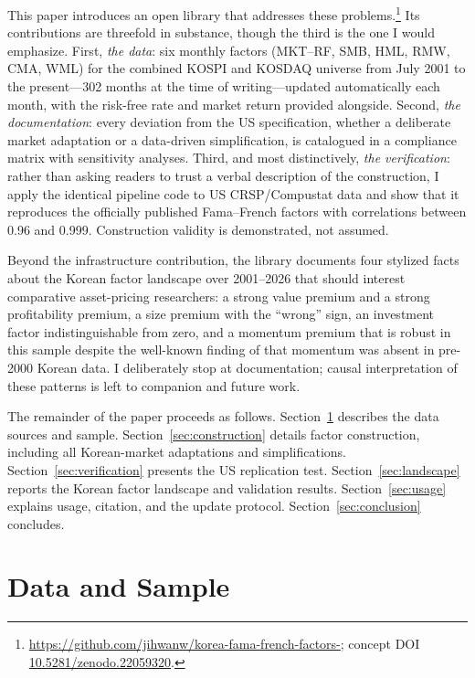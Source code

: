 \documentclass[11pt]{article}
\begin{document}
This paper introduces an open library that addresses these problems.\footnote{\url{https://github.com/jihwanw/korea-fama-french-factors-}; concept DOI \href{https://doi.org/10.5281/zenodo.22059320}{10.5281/zenodo.22059320}.} Its contributions are threefold in substance, though the third is the one I would emphasize. First, \emph{the data}: six monthly factors (MKT--RF, SMB, HML, RMW, CMA, WML) for the combined KOSPI and KOSDAQ universe from July 2001 to the present---302 months at the time of writing---updated automatically each month, with the risk-free rate and market return provided alongside. Second, \emph{the documentation}: every deviation from the US specification, whether a deliberate market adaptation or a data-driven simplification, is catalogued in a compliance matrix with sensitivity analyses. Third, and most distinctively, \emph{the verification}: rather than asking readers to trust a verbal description of the construction, I apply the identical pipeline code to US CRSP/Compustat data and show that it reproduces the officially published Fama--French factors with correlations between 0.96 and 0.999. Construction validity is demonstrated, not assumed.

Beyond the infrastructure contribution, the library documents four stylized facts about the Korean factor landscape over 2001--2026 that should interest comparative asset-pricing researchers: a strong value premium and a strong profitability premium, a size premium with the ``wrong'' sign, an investment factor indistinguishable from zero, and a momentum premium that is robust in this sample despite the well-known finding of \citet{griffin2003} that momentum was absent in pre-2000 Korean data. I deliberately stop at documentation; causal interpretation of these patterns is left to companion and future work.

The remainder of the paper proceeds as follows. Section~\ref{sec:data} describes the data sources and sample. Section~\ref{sec:construction} details factor construction, including all Korean-market adaptations and simplifications. Section~\ref{sec:verification} presents the US replication test. Section~\ref{sec:landscape} reports the Korean factor landscape and validation results. Section~\ref{sec:usage} explains usage, citation, and the update protocol. Section~\ref{sec:conclusion} concludes.

\section{Data and Sample}\label{sec:data}
\end{document}
